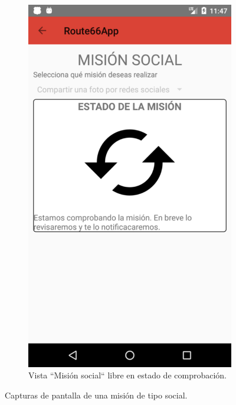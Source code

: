 \documentclass[twoside]{report}
\begin{document}
\begin{figure}[H]
\begin{center}
\begin{subfigure}[t]{.3\linewidth}
		\includegraphics[scale=0.2]{images/userguide/27.png}
		\caption{Vista “Misión social“ libre en estado de comprobación.}
	\end{subfigure}\hspace{2mm}%
\caption{Capturas de pantalla de una misión de tipo social.}
\end{center}
\end{figure}
\end{document}
